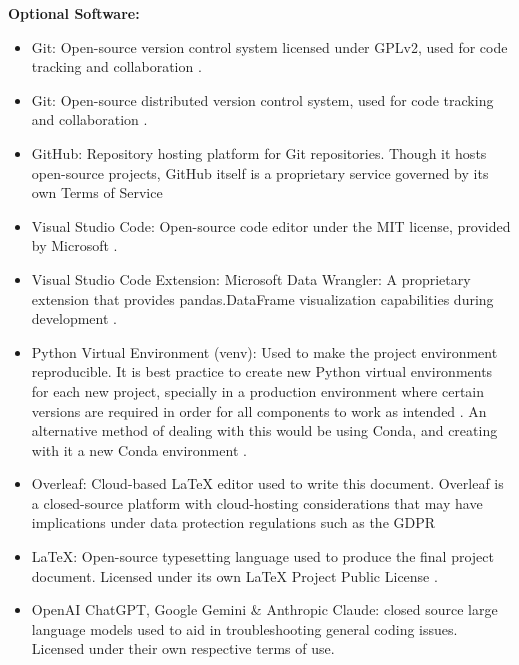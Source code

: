 \documentclass[12pt]{report} %
\begin{document}
\noindent \textbf{Optional Software:}
\begin{itemize}
    \item Git: Open-source version control system licensed under GPLv2, used for code tracking and collaboration \cite{git}.

    \item Git: Open-source distributed version control system, used for code tracking and collaboration \cite{git}.
    
    \item GitHub: Repository hosting platform for Git repositories. Though it hosts open-source projects, GitHub itself is a proprietary service governed by its own Terms of Service \cite{github}
    
    \item Visual Studio Code: Open-source code editor under the MIT license, provided by Microsoft \cite{vscode}.
    
    \item Visual Studio Code Extension: Microsoft Data Wrangler: A proprietary extension that provides pandas.DataFrame visualization capabilities during development \cite{VSCode_DataWrangler}.

    \item Python Virtual Environment (venv): Used to make the project environment reproducible. It is best practice to create new Python virtual environments for each new project, specially in a production environment where certain versions are required in order for all components to work as intended \cite{python_venv}. An alternative method of dealing with this would be using Conda, and creating with it a new Conda environment \cite{conda}.

    \item Overleaf: Cloud-based LaTeX editor used to write this document. Overleaf is a closed-source platform with cloud-hosting considerations that may have implications under data protection regulations such as the GDPR \cite{overleaf}
    
    \item LaTeX: Open-source typesetting language used to produce the final project document. Licensed under its own LaTeX Project Public License \cite{latex}.

    \item OpenAI ChatGPT, Google Gemini \& Anthropic Claude: closed source large language models used to aid in troubleshooting general coding issues. Licensed under their own respective terms of use. 
\end{itemize}
\end{document}
